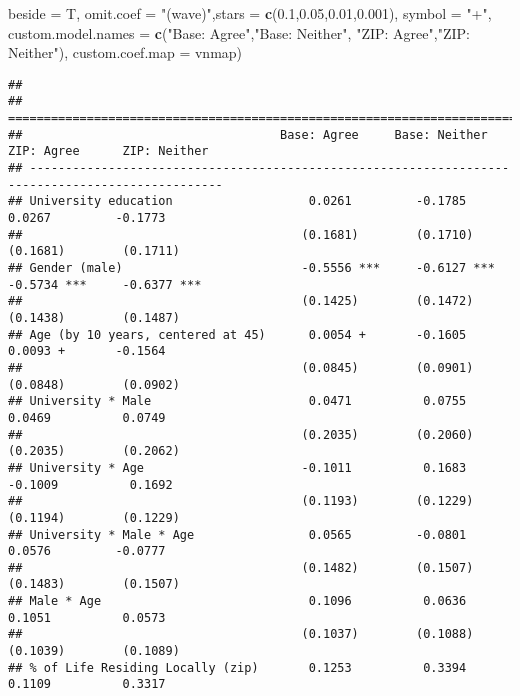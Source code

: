 \documentclass[
]{article}
\newenvironment{Shaded}{\begin{snugshade}}{\end{snugshade}}
\newcommand{\DataTypeTok}[1]{\textcolor[rgb]{0.13,0.29,0.53}{#1}}
\newcommand{\FloatTok}[1]{\textcolor[rgb]{0.00,0.00,0.81}{#1}}
\newcommand{\KeywordTok}[1]{\textcolor[rgb]{0.13,0.29,0.53}{\textbf{#1}}}
\newcommand{\NormalTok}[1]{#1}
\newcommand{\StringTok}[1]{\textcolor[rgb]{0.31,0.60,0.02}{#1}}
\begin{document}
\begin{Shaded}
\begin{Highlighting}[]
          \DataTypeTok{beside =}\NormalTok{ T,}
          \DataTypeTok{omit.coef =} \StringTok{"(wave)"}\NormalTok{,}\DataTypeTok{stars =} \KeywordTok{c}\NormalTok{(}\FloatTok{0.1}\NormalTok{,}\FloatTok{0.05}\NormalTok{,}\FloatTok{0.01}\NormalTok{,}\FloatTok{0.001}\NormalTok{), }\DataTypeTok{symbol =} \StringTok{"+"}\NormalTok{, }
          \DataTypeTok{custom.model.names =} \KeywordTok{c}\NormalTok{(}\StringTok{"Base: Agree"}\NormalTok{,}\StringTok{"Base: Neither"}\NormalTok{,}
                                 \StringTok{"ZIP: Agree"}\NormalTok{,}\StringTok{"ZIP: Neither"}\NormalTok{),}
          \DataTypeTok{custom.coef.map =}\NormalTok{ vnmap)}
\end{Highlighting}
\end{Shaded}

\begin{verbatim}
## 
## =================================================================================================
##                                    Base: Agree     Base: Neither   ZIP: Agree      ZIP: Neither  
## -------------------------------------------------------------------------------------------------
## University education                   0.0261         -0.1785          0.0267         -0.1773    
##                                       (0.1681)        (0.1710)        (0.1681)        (0.1711)   
## Gender (male)                         -0.5556 ***     -0.6127 ***     -0.5734 ***     -0.6377 ***
##                                       (0.1425)        (0.1472)        (0.1438)        (0.1487)   
## Age (by 10 years, centered at 45)      0.0054 +       -0.1605          0.0093 +       -0.1564    
##                                       (0.0845)        (0.0901)        (0.0848)        (0.0902)   
## University * Male                      0.0471          0.0755          0.0469          0.0749    
##                                       (0.2035)        (0.2060)        (0.2035)        (0.2062)   
## University * Age                      -0.1011          0.1683         -0.1009          0.1692    
##                                       (0.1193)        (0.1229)        (0.1194)        (0.1229)   
## University * Male * Age                0.0565         -0.0801          0.0576         -0.0777    
##                                       (0.1482)        (0.1507)        (0.1483)        (0.1507)   
## Male * Age                             0.1096          0.0636          0.1051          0.0573    
##                                       (0.1037)        (0.1088)        (0.1039)        (0.1089)   
## % of Life Residing Locally (zip)       0.1253          0.3394          0.1109          0.3317    

\end{verbatim}
\end{document}
